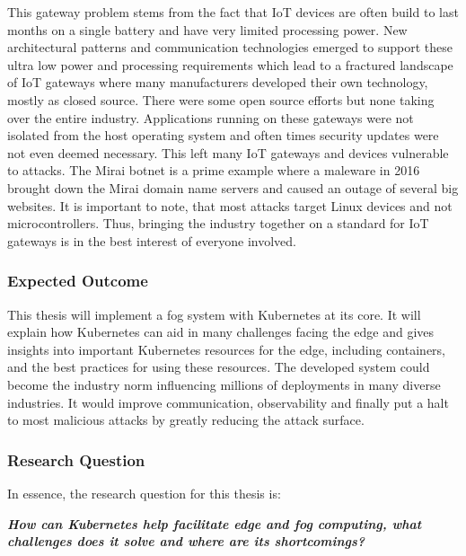{This gateway problem stems from the fact that IoT devices are often build to last months on a single battery and have very limited processing power. New architectural patterns and communication technologies emerged to support these ultra low power and processing requirements which lead to a fractured landscape of IoT gateways where many manufacturers developed their own technology, mostly as closed source. There were some open source efforts but none taking over the entire industry. Applications running on these gateways were not isolated from the host operating system and often times security updates were not even deemed necessary. This left many IoT gateways and devices vulnerable to attacks. The Mirai botnet\cite{7971869MiraiAndOtherBotnetLinux} is a prime example where a maleware in 2016 brought down the Mirai domain name servers and caused an outage of several big websites. It is important to note, that most attacks target Linux devices and not microcontrollers. Thus, bringing the industry together on a standard for IoT gateways is in the best interest of everyone involved. 
}

\subsubsection{Expected Outcome}
This thesis will implement a fog system with Kubernetes at its core. It will explain how Kubernetes can aid in many challenges facing the edge and gives insights into important Kubernetes resources for the edge, including containers, and the best practices for using these resources. The developed system could become the industry norm influencing millions of deployments in many diverse industries. It would improve communication, observability and finally put a halt to most malicious attacks by greatly reducing the attack surface.\\

\subsubsection{Research Question}
In essence, the research question for this thesis is:
\begin{displayquote}\begin{center}
{\textit{\textbf{How can Kubernetes help facilitate edge and fog computing, what challenges does it solve and where are its shortcomings?}}}
\end{center}\end{displayquote}

